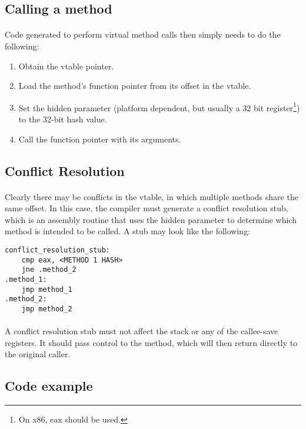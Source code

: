 \documentclass[12pt,twoside,notitlepage]{report}
\begin{document}
\subsection{Calling a method}

\paragraph{}
Code generated to perform virtual method calls then simply needs to do the following:

\begin{enumerate}
\item Obtain the vtable pointer.
\item Load the method's function pointer from its offset in the vtable.
\item Set the hidden parameter (platform dependent, but usually a 32 bit register\footnote{On x86, eax should be used.}) to the 32-bit hash value.
\item Call the function pointer with its arguments.
\end{enumerate}

\subsection{Conflict Resolution}

\paragraph{}
Clearly there may be conflicts in the vtable, in which multiple methods share the same offset. In this case, the compiler must generate a conflict resolution stub, which is an assembly routine that uses the hidden parameter to determine which method is intended to be called. A stub may look like the following:

\begin{lstlisting}
conflict_resolution_stub:
	cmp eax, <METHOD 1 HASH>
	jne .method_2
.method_1:
	jmp method_1
.method_2:
	jmp method_2
\end{lstlisting}

\paragraph{}
A conflict resolution stub must not affect the stack or any of the callee-save registers. It should pass control to the method, which will then return directly to the original caller.

\subsection{Code example}
\end{document}
